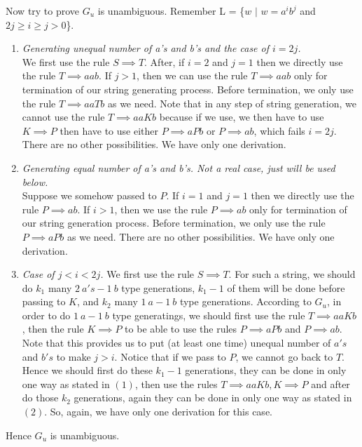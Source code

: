 \documentclass[12pt]{article}
\begin{document}
Now try to prove $G_u$ is unambiguous.
Remember L = \{$w$ $|$ $w=a^ib^j$ and $2j\geq i\geq j > 0$\}.

\begin{enumerate}
    \item{\textit{Generating unequal number of a's and b's and the case of $i=2j$.}} \\
        We first use the rule $S\implies T$. After, if $i=2$ and $j=1$ then we directly use the rule $T\implies aab$. If $j>1$, then we can use the rule $T\implies aab$ only for termination of our string generating process. Before termination, we only use the rule $T\implies aaTb$ as we need. Note that in any step of string generation, we cannot use the rule $T\implies aaKb$ because if we use, we then have to use $K\implies P$ then have to use either $P\implies aPb$ or $P\implies ab$, which fails $i=2j$. There are no other possibilities. We have only one derivation.
    \item{\textit{Generating equal number of a's and b's. Not a real case, just will be used below.}} \\
        Suppose we somehow passed to $P$. If $i=1$ and $j=1$ then we directly use the rule $P\implies ab$. If $i>1$, then we use the rule $P\implies ab$ only for termination of our string generation process. Before termination, we only use the rule $P\implies aPb$ as we need. There are no other possibilities. We have only one derivation.
    \item{\textit{Case of $j<i<2j$.}}
        We first use the rule $S\implies T$. For such a string, we should do $k_1$ many $2\ a's-1\ b$ type generations, $k_1 - 1$ of them will be done before passing to $K$, and $k_2$ many $1\ a-1\ b$ type generations. According to $G_u$, in order to do $1\ a-1\ b$ type generatings, we should first use the rule $T\implies aaKb$, then the rule $K\implies P$ to be able to use the rules $P\implies aPb$ and $P \implies ab$. Note that this provides us to put (at least one time) unequal number of $a's$ and $b's$ to make $j>i$. Notice that if we pass to $P$, we cannot go back to $T$. Hence we should first do these $k_1 - 1$ generations, they can be done in only one way as stated in $(1)$, then use the rules $T\implies aaKb, K\implies P$ and after do those $k_2$ generations, again they can be done in only one way as stated in $(2)$. So, again, we have only one derivation for this case.
\end{enumerate}

Hence $G_u$ is unambiguous.
\end{document}
